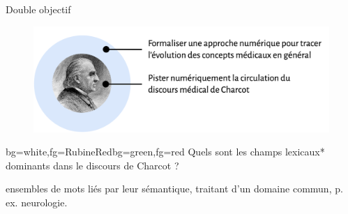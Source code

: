\begin{frame}{Double objectif}
	        \begin{figure}
		\centering
		\includegraphics[width=1\textwidth]{pic/objectif_double2.png}
	\end{figure}

\begin{variableblock}{}{bg=white,fg=RubineRed}{bg=green,fg=red}
\centering
Quels sont les champs lexicaux* dominants dans le discours de Charcot ?
\end{variableblock}

{\footnotesize ensembles de mots liés par leur sémantique, traitant d'un domaine commun, p. ex. neurologie.}
\end{frame}